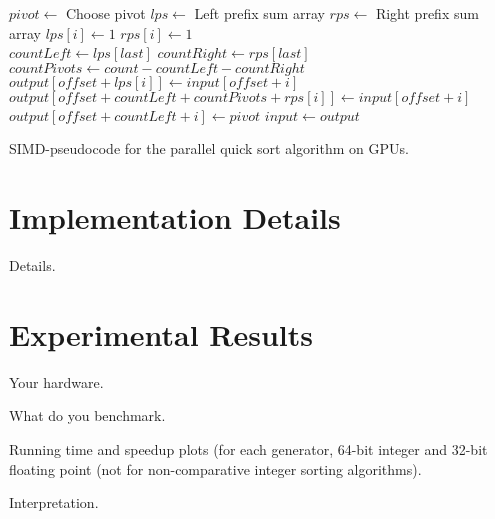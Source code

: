 \documentclass{llncs}
\begin{document}
\begin{algorithm}
\begin{algorithmic}
\State $pivot \gets$ Choose pivot
\State $lps \gets$ Left prefix sum array
\State $rps \gets$ Right prefix sum array
  \State $lps[i] \gets 1$
  \State $rps[i] \gets 1$
\EndIf\\
\State {}
\State {}
\State $countLeft \gets lps[last]$
\State $countRight \gets rps[last]$
\State $countPivots \gets count - countLeft - countRight$\\
  \State $output[offset + lps[i]] \gets input[offset + i]$
  \State $output[offset + countLeft + countPivots + rps[i]] \gets input[offset + i]$
\EndIf
{}
  \State $output[offset + countLeft +i] \gets pivot$
\EndIf
\State $input \gets output$
\State {}
\State {}
\EndFunction
\end{algorithmic}
\label{alg1}
\caption{SIMD-pseudocode for the parallel quick sort algorithm on GPUs.}
\end{algorithm}

\section{Implementation Details}

Details.

\section{Experimental Results}

Your hardware.

What do you benchmark.

Running time and speedup plots (for each generator, 64-bit integer and 32-bit floating point (not for  non-comparative integer sorting algorithms).

Interpretation.



\end{document}
